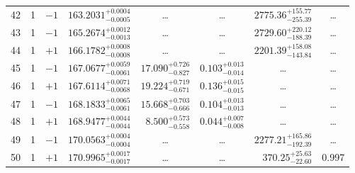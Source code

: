 \begin{table*}[!]
\begin{tabular}{llcrrlrc}
42 & 1 & $-1$ & $    163.2031_{-      0.0005}^{+      0.0004}$ & \multicolumn{1}{c}{\dots} & \multicolumn{1}{c}{\dots} & $     2775.36_{-      255.39}^{+      155.77}$ & \dots \\[1pt]
43 & 1 & $-1$ & $    165.2674_{-      0.0013}^{+      0.0012}$ & \multicolumn{1}{c}{\dots} & \multicolumn{1}{c}{\dots} & $     2729.60_{-      188.39}^{+      220.12}$ & \dots \\[1pt]
44 & 1 & $+1$ & $    166.1782_{-      0.0008}^{+      0.0008}$ & \multicolumn{1}{c}{\dots} & \multicolumn{1}{c}{\dots} & $     2201.39_{-      143.84}^{+      158.08}$ & \dots \\[1pt]
45 & 1 & $-1$ & $    167.0677_{-      0.0061}^{+      0.0059}$ & $      17.090_{-       0.827}^{+       0.726}$ & $       0.103_{-       0.014}^{+       0.013}$ & \multicolumn{1}{c}{\dots} & \dots \\[1pt]
46 & 1 & $+1$ & $    167.6114_{-      0.0068}^{+      0.0071}$ & $      19.224_{-       0.671}^{+       0.719}$ & $       0.136_{-       0.015}^{+       0.015}$ & \multicolumn{1}{c}{\dots} & \dots \\[1pt]
47 & 1 & $-1$ & $    168.1833_{-      0.0061}^{+      0.0065}$ & $      15.668_{-       0.666}^{+       0.703}$ & $       0.104_{-       0.013}^{+       0.013}$ & \multicolumn{1}{c}{\dots} & \dots \\[1pt]
48 & 1 & $+1$ & $    168.9477_{-      0.0044}^{+      0.0044}$ & $       8.500_{-       0.558}^{+       0.573}$ & $       0.044_{-       0.008}^{+       0.007}$ & \multicolumn{1}{c}{\dots} & \dots \\[1pt] 
49 & 1 & $-1$ & $    170.0563_{-      0.0004}^{+      0.0004}$ & \multicolumn{1}{c}{\dots} & \multicolumn{1}{c}{\dots} & $     2277.21_{-      192.39}^{+      165.86}$ & \dots \\[1pt]
50 & 1 & $+1$ & $    170.9965_{-      0.0017}^{+      0.0017}$ & \multicolumn{1}{c}{\dots} & \multicolumn{1}{c}{\dots} & $      370.25_{-       22.60}^{+       25.63}$ & 0.997\\[1pt]


\end{tabular}
\end{table*}
